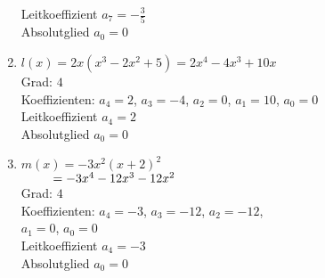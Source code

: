 \begin{Answer}[ref=ganzHauptA1]
\begin{minipage}{\textwidth}
\begin{minipage}[t]{0.49\textwidth}
\begin{enumerate}[label=\alph*)]
				Leitkoeffizient \(a_7=-\frac{3}{5}\)\\
				Absolutglied \(a_0=0\)
				\item \(l(x)=2x\left(x^3-2x^2+5\right)=2x^4-4x^3+10x\)\\
				Grad: \(4\)\\
				Koeffizienten: \(a_4=2\), \(a_3=-4\), \(a_2=0\), \(a_1=10\), \(a_0=0\)\\
				Leitkoeffizient \(a_4=2\)\\
				Absolutglied \(a_0=0\)
				\item \(m(x)=-3x^2\left(x+2\right)^2\)\\
				\(\hphantom{m(x)}=-3x^4-12x^3-12x^2\)\\
				Grad: \(4\)\\
				Koeffizienten: \(a_4=-3\), \(a_3=-12\), \(a_2=-12\),\\
				\(a_1=0\), \(a_0=0\)\\
				Leitkoeffizient \(a_4=-3\)\\
				Absolutglied \(a_0=0\)
			\end{enumerate}
		\end{minipage}
	\end{minipage}
\end{Answer}